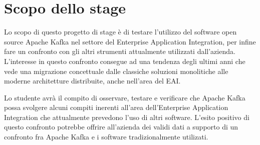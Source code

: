 \section*{Scopo dello stage}
Lo scopo di questo progetto di stage è di testare l'utilizzo del software open source Apache Kafka nel settore del Enterprise Application Integration, per infine fare un confronto con gli altri strumenti attualmente utilizzati dall'azienda.
L'interesse in questo confronto consegue ad una tendenza degli ultimi anni che vede una migrazione concettuale dalle classiche soluzioni monolitiche alle moderne architetture distribuite, anche nell'area del EAI.

Lo studente avrà il compito di osservare, testare e verificare che Apache Kafka possa svolgere alcuni compiti inerenti all'area dell'Enterprise Application Integration che attualmente prevedono l'uso di altri software.
L'esito positivo di questo confronto potrebbe offrire all'azienda dei validi dati a supporto di un confronto fra Apache Kafka e i software tradizionalmente utilizati.
